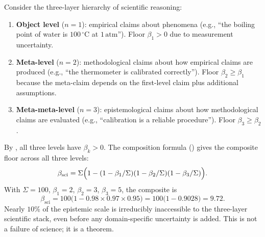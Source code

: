 \begin{example}
\label{ex:ch02-science-recursion}
Consider the three-layer hierarchy of scientific reasoning:
\begin{enumerate}[(1)]
  \item \textbf{Object level} ($n = 1$): empirical claims about phenomena
    (e.g., ``the boiling point of water is $100\,^\circ\text{C}$ at
    $1\,\text{atm}$'').  Floor $\beta_1 > 0$ due to measurement uncertainty.
  \item \textbf{Meta-level} ($n = 2$): methodological claims about how
    empirical claims are produced (e.g., ``the thermometer is calibrated
    correctly'').  Floor $\beta_2 \geq \beta_1$ because the meta-claim depends
    on the first-level claim plus additional assumptions.
  \item \textbf{Meta-meta-level} ($n = 3$): epistemological claims about how
    methodological claims are evaluated (e.g., ``calibration is a reliable
    procedure'').  Floor $\beta_3 \geq \beta_2$.
\end{enumerate}
By , all three levels have $\beta_k > 0$.
The composition formula () gives the composite floor
across all three levels:
\[
  \beta_{\mathrm{sci}} = \Sigma\Bigl(1 - (1 - \beta_1/\Sigma)(1 - \beta_2/\Sigma)
    (1 - \beta_3/\Sigma)\Bigr).
\]
With $\Sigma = 100$, $\beta_1 = 2$, $\beta_2 = 3$, $\beta_3 = 5$, the composite
is
\[
  \beta_{\mathrm{sci}}
  = 100\bigl(1 - 0.98 \times 0.97 \times 0.95\bigr)
  = 100\bigl(1 - 0.9028\bigr) = 9.72.
\]
Nearly $10\%$ of the epistemic scale is irreducibly inaccessible to the
three-layer scientific stack, even before any domain-specific uncertainty is
added.  This is not a failure of science; it is a theorem.
\end{example}

